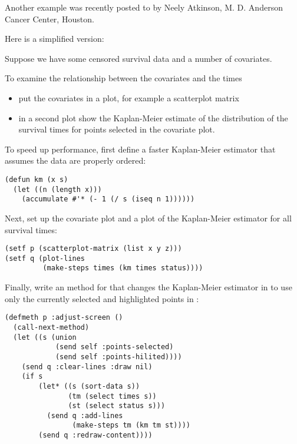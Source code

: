 \begin{slide}{}
Another example was recently posted to  by Neely
Atkinson, M. D. Anderson Cancer Center, Houston.

Here is a simplified version:

Suppose we have some censored survival data and a number of covariates.

To examine the relationship between the covariates and the times
\begin{itemize}
\item
put the covariates in a plot, for example a scatterplot matrix
\item
in a second plot show the Kaplan-Meier estimate of the distribution of
the survival times for points selected in the covariate plot.
\end{itemize}

To speed up performance, first define a faster Kaplan-Meier estimator
that assumes the data are properly ordered:
{\Large
\begin{verbatim}
(defun km (x s)
  (let ((n (length x)))
    (accumulate #'* (- 1 (/ s (iseq n 1))))))
\end{verbatim}}
\end{slide}{}

\begin{slide}{}
Next, set up the covariate plot and a plot of the Kaplan-Meier
estimator for all survival times: {\Large
\begin{verbatim}
(setf p (scatterplot-matrix (list x y z)))
(setf q (plot-lines
         (make-steps times (km times status))))
\end{verbatim}}
Finally, write an  method for  that
changes the Kaplan-Meier estimator in  to use only the
currently selected and highlighted points in :
{\Large
\begin{verbatim}
(defmeth p :adjust-screen ()
  (call-next-method)
  (let ((s (union
            (send self :points-selected)
            (send self :points-hilited))))
    (send q :clear-lines :draw nil)
    (if s
        (let* ((s (sort-data s))
               (tm (select times s))
               (st (select status s)))
          (send q :add-lines
                (make-steps tm (km tm st))))
        (send q :redraw-content))))
\end{verbatim}}
\end{slide}


